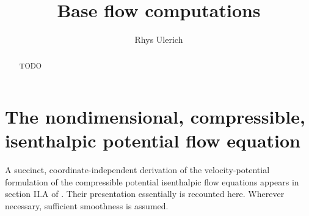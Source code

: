 \documentclass[letterpaper,11pt,nointlimits,reqno]{amsart}
\begin{document}
\title{Base flow computations}
\author{Rhys Ulerich}

\begin{abstract}
TODO
\end{abstract}

\maketitle

\tableofcontents

\section{The nondimensional, compressible, isenthalpic potential flow equation}

A succinct, coordinate-independent derivation of the velocity-potential
formulation of the compressible potential isenthalpic flow equations appears in
section II.A of \citet{Saad2011Coordinate}.  Their presentation essentially is
recounted here.  Wherever necessary, sufficient smoothness is assumed.
\end{document}
